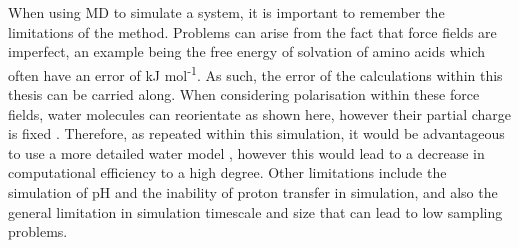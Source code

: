 When using MD to simulate a system, it is important to remember the limitations of the method. Problems can arise from the fact that force fields are imperfect, an example being the free energy of solvation of amino acids which often have an error of  kJ mol\textsuperscript{-1}. As such, the error of the calculations within this thesis can be carried along. When considering polarisation within these force fields, water molecules can reorientate as shown here, however their partial charge is fixed \citep{Apol2013}. Therefore, as repeated within this simulation, it would be advantageous to use a more detailed water model \cite{Chaplin2001}, however this would lead to a decrease in computational efficiency to a high degree.  Other limitations include the simulation of pH and the inability of proton transfer in simulation, and also the general limitation in simulation timescale and size that can lead to low sampling problems. 

